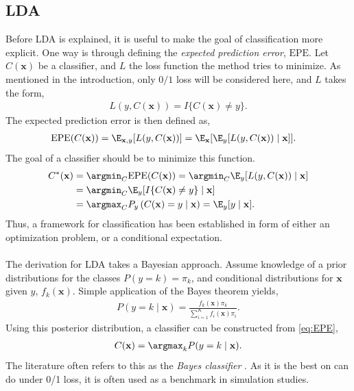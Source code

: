 \subsection{LDA}
\label{sub:LDA}
Before LDA is explained, it is useful to make the goal of classification more explicit. One way is through defining the \textit{expected prediction error}, $\mathrm{EPE}$.
Let $ C(\mathbf{x})$ be a classifier, and $L$ the loss function the method tries to minimize. As mentioned in the introduction, only $0/1$ loss will be considered here, and $L$ takes the form,
\begin{align}
  L(y, C(\mathbf{x})) = I\{ C(\mathbf{x}) \neq y \}. 
\end{align}
The expected prediction error is then defined as,
\begin{align}
  \mathrm{EPE}(C(\mathbf{x})) 
  &= \E_{\mathbf{x}, y}[L(y, C(\mathbf{x}))] = \E_{\mathbf{x}}[\E_{y}[L(y, C(\mathbf{x})) \mid  \mathbf{x}]].
\end{align}
The goal of a classifier should be to minimize this function.
\begin{align}
  C^*(\mathbf{x}) 
  &= \argmin_{ C} \mathrm{EPE}(C(\mathbf{x})) = \argmin_{ C} \E_{y}[L(y,  C(\mathbf{x})) \mid  \mathbf{x}] \notag \\
  &= \argmin_{ C} \E_{y}[I\{ C(\mathbf{x}) \neq y \} \mid  \mathbf{x}] \notag \\
  \label{eq:EPE} 
  &= \argmax_{ C} P_{y}\left( C(\mathbf{x}) = y  \mid  \mathbf{x}  \right) = \E_y [y \mid  \mathbf{x}].
\end{align}
Thus, a framework for classification has been established in form of either an optimization problem, or a conditional expectation.
\\
\\
The derivation for LDA takes a Bayesian approach. 
Assume knowledge of a prior distributions for the classes $P(y = k) = \pi_k$, and conditional distributions for $\mathbf{x}$ given $y$, $f_k(\mathbf{x})$. Simple application of the Bayes theorem yields,
\begin{align}
  \label{eq:ldaPostProb} 
  P(y=k\mid \mathbf{x}) = \frac{f_k(\mathbf{x}) \pi_k}{\sum^{K}_{i=1} f_i(\mathbf{x})\pi_i} .
\end{align}
Using this posterior distribution, a classifier can be constructed from \eqref{eq:EPE},
\begin{align}
  \label{eq:bayesian} 
  C(\mathbf{x}) = \argmax_k P(y=k\mid \mathbf{x}).
\end{align}
The literature often refers to this as the \textit{Bayes classifier} \cite{modstat}. As it is the best on can do under 0/1 loss, it is often used as a benchmark in simulation studies. 


